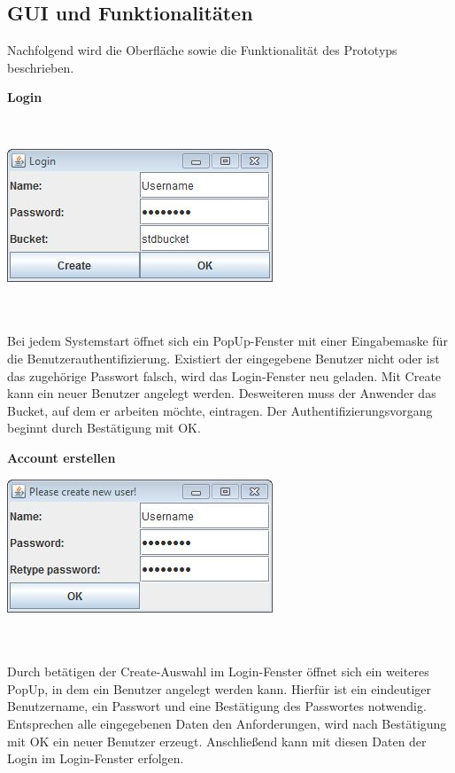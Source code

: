 \documentclass[12pt,a4paper,bibliography=totocnumbered,listof=totocnumbered]{scrartcl}
\begin{document}
\subsection{GUI und Funktionalitäten}\label{GUIV}
Nachfolgend wird die Oberfläche sowie die Funktionalität des Prototyps beschrieben.

\textbf{Login}

\vspace{1em}
$\;$\\
\begin{minipage}{\linewidth}
	\centering
	\includegraphics[width=0.4\linewidth]{Login.jpg}
	\label{Login}
\end{minipage}
\\\\Bei jedem Systemstart öffnet sich ein PopUp-Fenster mit einer Eingabemaske für die Benutzerauthentifizierung. Existiert der eingegebene Benutzer nicht oder ist das zugehörige Passwort falsch, wird das Login-Fenster neu geladen. Mit Create kann ein neuer Benutzer angelegt werden. Desweiteren muss der Anwender das Bucket, auf dem er arbeiten möchte, eintragen. Der Authentifizierungsvorgang beginnt durch Bestätigung mit OK.

\textbf{Account erstellen}
\vspace{1em}
$\;$\\
\begin{minipage}{\linewidth}
	\centering
	\includegraphics[width=0.4\linewidth]{Create.jpg}
	\label{Create}
\end{minipage}
\\\\Durch betätigen der Create-Auswahl im Login-Fenster öffnet sich ein weiteres PopUp, in dem ein Benutzer angelegt werden kann. Hierfür ist ein eindeutiger Benutzername, ein Passwort und eine Bestätigung des Passwortes notwendig. Entsprechen alle eingegebenen Daten den Anforderungen, wird nach Bestätigung mit OK ein neuer Benutzer erzeugt. Anschließend kann mit diesen Daten der Login im Login-Fenster erfolgen.
\end{document}
